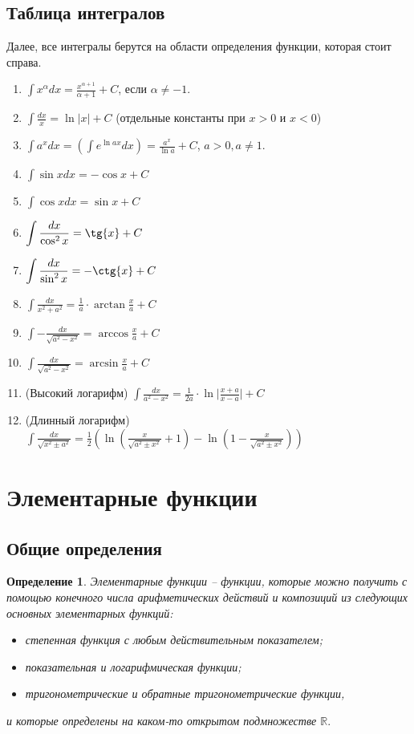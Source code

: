 \documentclass{article}
\theoremstyle{plain}
\newtheorem{definition}{Определение}
\theoremstyle{definition}
\theoremstyle{remark}
\renewcommand{\*}{\cdot}
\begin{document}
\subsection{Таблица интегралов}
Далее, все интегралы берутся на области определения функции, которая стоит справа.
\begin{enumerate}
    \item $\displaystyle \int x^{\alpha}dx = \frac{x^{\alpha + 1}}{\alpha + 1} + C$, если $\alpha \neq -1$.
    \item $\displaystyle\int \frac{dx}{x} = \ln{|x|} + C$ (отдельные константы при $x > 0$ и $x < 0$)
    \item $\displaystyle\int a^xdx  = \left(\int e^{\ln{a}x}dx \right) = \frac{a^x}{\ln{a}} + C$, $a > 0, a \neq 1.$
    \item $\displaystyle\int \sin{x}dx = -\cos{x} + C$
    \item $\displaystyle\int \cos{x}dx = \sin{x} + C$
    \item $\displaystyle\int \frac{dx}{\cos^2{x}} = \tg{x} + C$
    \item $\displaystyle\int \frac{dx}{\sin^2{x}} = -\ctg{x} + C$
    \item $\displaystyle\int \frac{dx}{x^2 + a^2} = \frac{1}{a} \cdot \arctan{\frac{x}{a}} + C$
    \item $\displaystyle\int -\frac{dx}{\sqrt{a^2 - x^2}} = \arccos{\frac{x}{a}} + C$
    \item $\displaystyle\int \frac{dx}{\sqrt{a^2 - x^2}} = \arcsin{\frac{x}{a}} + C$
    \item (Высокий логарифм) $\displaystyle\int \frac{dx}{a^2 - x^2} = \frac{1}{2a} \cdot \ln{\Big|\frac{x+a}{x-a}\Big|} + C$ 
    \item (Длинный логарифм) $\displaystyle\int \frac{dx}{\sqrt{x^2 \pm a^2}} = \frac{1}{2}\left(\ln{\left(\frac{x}{\sqrt{a^2 \pm x^2}} + 1\right)} - \ln{\left(1 - \frac{x}{\sqrt{a^2 \pm x^2}}\right)}\right)$
\end{enumerate}

\section{Элементарные функции}
\subsection{Общие определения}
\begin{definition}
Элементарные функции -- функции, которые можно получить с помощью конечного числа арифметических действий и композиций из следующих основных элементарных функций:
\begin{itemize}
    \item степенная функция с любым действительным показателем;
    \item показательная и логарифмическая функции;
    \item тригонометрические и обратные тригонометрические функции,
\end{itemize}
и которые определены на каком-то открытом подмножестве $\mathbb{R}.$
\end{definition}
\end{document}
